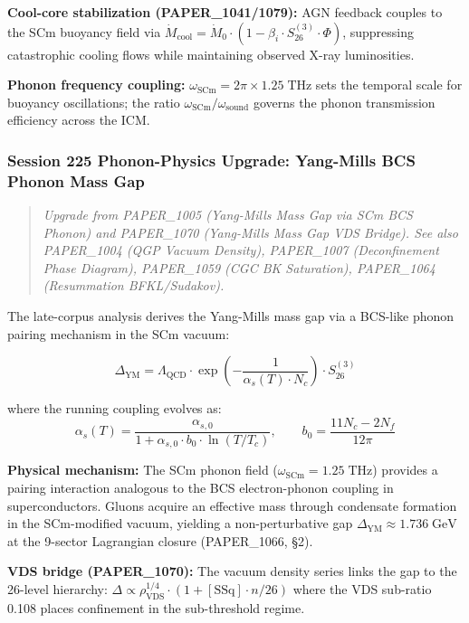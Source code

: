 \documentclass[
  11pt,
]{article}
\begin{document}
\textbf{Cool-core stabilization (PAPER\_1041/1079):} AGN feedback
couples to the SCm buoyancy field via
$\dot{M}_{\text{cool}} = \dot{M}_0 \cdot (1 - \beta_i \cdot S_{26}^{(3)} \cdot \Phi)$,
suppressing catastrophic cooling flows while maintaining observed X-ray
luminosities.

\textbf{Phonon frequency coupling:}
$\omega_{\text{SCm}} = 2\pi \times 1.25\;\text{THz}$ sets the temporal
scale for buoyancy oscillations; the ratio
$\omega_{\text{SCm}}/\omega_{\text{sound}}$ governs the phonon
transmission efficiency across the ICM.

\subsubsection{Session 225 Phonon-Physics Upgrade: Yang-Mills BCS Phonon
Mass
Gap}\label{session-225-phonon-physics-upgrade-yang-mills-bcs-phonon-mass-gap}

\begin{quote}
\emph{Upgrade from PAPER\_1005 (Yang-Mills Mass Gap via SCm BCS Phonon)
and PAPER\_1070 (Yang-Mills Mass Gap VDS Bridge). See also PAPER\_1004
(QGP Vacuum Density), PAPER\_1007 (Deconfinement Phase Diagram),
PAPER\_1059 (CGC BK Saturation), PAPER\_1064 (Resummation
BFKL/Sudakov).}
\end{quote}

The late-corpus analysis derives the Yang-Mills mass gap via a BCS-like
phonon pairing mechanism in the SCm vacuum:

\[\Delta_{\text{YM}} = \Lambda_{\text{QCD}} \cdot \exp\!\left(-\frac{1}{\alpha_s(T) \cdot N_c}\right) \cdot S_{26}^{(3)}\]

where the running coupling evolves as:
\[\alpha_s(T) = \frac{\alpha_{s,0}}{1 + \alpha_{s,0} \cdot b_0 \cdot \ln(T/T_c)}, \qquad b_0 = \frac{11 N_c - 2 N_f}{12\pi}\]

\textbf{Physical mechanism:} The SCm phonon field
($\omega_{\text{SCm}} = 1.25\;\text{THz}$) provides a pairing
interaction analogous to the BCS electron-phonon coupling in
superconductors. Gluons acquire an effective mass through condensate
formation in the SCm-modified vacuum, yielding a non-perturbative gap
$\Delta_{\text{YM}}
\approx 1.736\;\text{GeV}$ at the 9-sector Lagrangian closure
(PAPER\_1066, §2).

\textbf{VDS bridge (PAPER\_1070):} The vacuum density series links the
gap to the 26-level hierarchy:
$\Delta \propto \rho_{\text{VDS}}^{1/4} \cdot (1 + [\text{SSq}] \cdot n/26)$
where the VDS sub-ratio 0.108 places confinement in the sub-threshold
regime.
\end{document}
